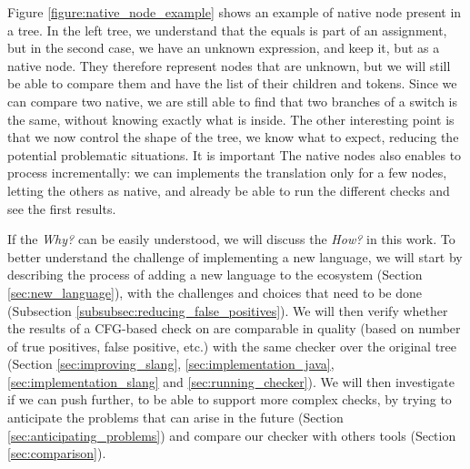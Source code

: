 Figure \ref{figure:native_node_example} shows an example of native node present in a \slang{} tree. In the left tree, we understand that the equals is part of an assignment, but in the second case, we have an unknown expression, and keep it, but as a native node.
They therefore represent nodes that are unknown, but we will still be able to compare them and have the list of their children and tokens. 
Since we can compare two native, we are still able to find that two branches of a switch is the same, without knowing exactly what is inside. 
The other interesting point is that we now control the shape of the tree, we know what to expect, reducing the potential problematic situations.
It is important The native nodes also enables to process incrementally: we can implements the translation only for a few nodes, letting the others as native, and already be able to run the different checks and see the first results.


If the \emph{Why?} can be easily understood, we will discuss the \emph{How?} in this work. 
To better understand the challenge of implementing a new language, we will start by describing the process of adding a new language to the ecosystem (Section \ref{sec:new_language}), with the challenges and choices that need to be done (Subsection \ref{subsubsec:reducing_false_positives}). 
We will then verify whether the results of a CFG-based check on \slang{} are comparable in quality (based on number of true positives, false positive, etc.) with the same checker over the original tree (Section \ref{sec:improving_slang}, \ref{sec:implementation_java}, \ref{sec:implementation_slang} and \ref{sec:running_checker}).
We will then investigate if we can push \slang{} further, to be able to support more complex checks, by trying to anticipate the problems that can arise in the future (Section \ref{sec:anticipating_problems}) and compare our checker with others tools (Section \ref{sec:comparison}).




